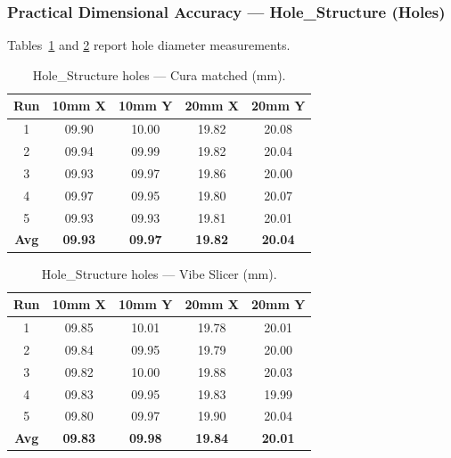 \documentclass[10pt,twocolumn,a4paper]{article}
\begin{document}
\subsubsection*{Practical Dimensional Accuracy — Hole\_Structure (Holes)}

Tables~\ref{tab:hole_cura_holes} and \ref{tab:hole_vibe_holes}
report hole diameter measurements.

\begin{table}[H]
\centering
\caption{Hole\_Structure holes — Cura matched (mm).}
\label{tab:hole_cura_holes}
\small
\begin{tabular}{@{}ccccc@{}}
\toprule
\textbf{Run} & \textbf{10mm X} & \textbf{10mm Y} & \textbf{20mm X} & \textbf{20mm Y} \\
\midrule
1 & 09.90 & 10.00 & 19.82 & 20.08 \\
2 & 09.94 & 09.99 & 19.82 & 20.04 \\
3 & 09.93 & 09.97 & 19.86 & 20.00 \\
4 & 09.97 & 09.95 & 19.80 & 20.07 \\
5 & 09.93 & 09.93 & 19.81 & 20.01 \\
\midrule
\textbf{Avg} & \textbf{09.93} & \textbf{09.97} & \textbf{19.82} & \textbf{20.04} \\
\bottomrule
\end{tabular}
\end{table}

\begin{table}[H]
\centering
\caption{Hole\_Structure holes — Vibe Slicer (mm).}
\label{tab:hole_vibe_holes}
\small
\begin{tabular}{@{}ccccc@{}}
\toprule
\textbf{Run} & \textbf{10mm X} & \textbf{10mm Y} & \textbf{20mm X} & \textbf{20mm Y} \\
\midrule
1 & 09.85 & 10.01 & 19.78 & 20.01 \\
2 & 09.84 & 09.95 & 19.79 & 20.00 \\
3 & 09.82 & 10.00 & 19.88 & 20.03 \\
4 & 09.83 & 09.95 & 19.83 & 19.99 \\
5 & 09.80 & 09.97 & 19.90 & 20.04 \\
\midrule
\textbf{Avg} & \textbf{09.83} & \textbf{09.98} & \textbf{19.84} & \textbf{20.01} \\
\bottomrule
\end{tabular}
\end{table}
\end{document}
